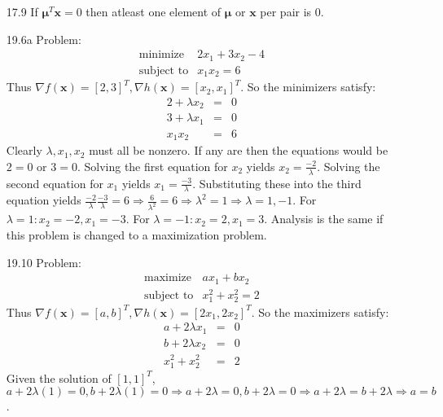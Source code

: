\documentclass{article}
\begin{document}
\begin{itemize}
\begin{enumerate}
		\end{enumerate}
	\item[17.9] If $\boldsymbol{\mu}^T \boldsymbol{x} = 0$ then atleast one element of $\boldsymbol{\mu}$ or $\boldsymbol{x}$ per pair is 0.
	\item[19.6a] Problem:
		\begin{displaymath}
			\begin{array}{rl}
				\textrm{minimize} & 2x_1 + 3x_2 - 4 \\
				\textrm{subject to} & x_1 x_2 = 6
			\end{array}
		\end{displaymath}
		Thus $\nabla f(\boldsymbol{x}) = [2, 3]^T, \nabla h(\boldsymbol{x}) = [x_2, x_1]^T$. So the minimizers satisfy:
		\begin{eqnarray}
			2 + \lambda x_2 & = & 0 \nonumber \\
			3 + \lambda x_1 & = & 0 \nonumber \\
			x_1 x_2 & = & 6 \nonumber
		\end{eqnarray}
		Clearly $\lambda, x_1, x_2$ must all be nonzero. If any are then the equations would be $2 = 0$ or $3 = 0$. Solving the first equation for $x_2$ yields $x_2 = \frac{-2}{\lambda}$. Solving the second equation for $x_1$ yields $x_1 = \frac{-3}{\lambda}$. Substituting these into the third equation yields $\frac{-2}{\lambda} \frac{-3}{\lambda} = 6 \Rightarrow \frac{6}{\lambda^2} = 6 \Rightarrow \lambda^2 = 1 \Rightarrow \lambda = 1, -1$. For $\lambda = 1: x_2 = -2, x_1 = -3$. For $\lambda = -1: x_2 = 2, x_1 = 3$. Analysis is the same if this problem is changed to a maximization problem.
	\item[19.10] Problem:
		\begin{displaymath}
			\begin{array}{rl}
				\textrm{maximize} & ax_1 + bx_2 \\
				\textrm{subject to} & x_1^2 + x_2^2 = 2
			\end{array}
		\end{displaymath}
		Thus $\nabla f(\boldsymbol{x}) = [a, b]^T, \nabla h(\boldsymbol{x}) = [2x_1, 2x_2]^T$. So the maximizers satisfy:
		\begin{eqnarray}
			a + 2 \lambda x_1 & = & 0 \nonumber \\
			b + 2 \lambda x_2 & = & 0 \nonumber \\
			x_1^2 + x_2^2 & = & 2 \nonumber
		\end{eqnarray}
		Given the solution of $[1, 1]^T$, $a + 2 \lambda (1) = 0, b + 2 \lambda (1) = 0 \Rightarrow a + 2 \lambda = 0, b + 2 \lambda = 0 \Rightarrow a + 2 \lambda = b + 2 \lambda \Rightarrow a = b$.

\end{itemize}
\end{document}
